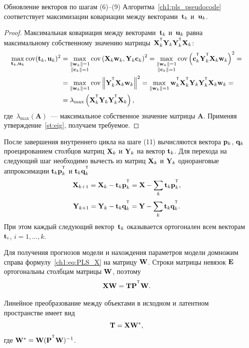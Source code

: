 \begin{statement}
	Обновление векторов по шагам (6)--(9) Алгоритма~\ref{ch1:pls_pseudocode} соответствует максимизации ковариации между векторами~$\mathbf{t}_k$ и~$\mathbf{u}_k$.
\end{statement}
\begin{proof}
	Максимальная ковариация между векторами~$\mathbf{t}_k$ и~$\mathbf{u}_k$ равна максимальному собственному значению матрицы~$\bX_k^{\T} \bY_k \bY_k^{\T} \bX_k$:
	\begin{align*}
		\max_{\bt_k, \bu_k}  \text{cov} (\bt_k, \bu_k)^2 &= \max_{\substack{\|\bw_k\|=1 \\ \|\bc_k\| = 1}} \text{cov} \left( \bX_k \bw_k, \bY_k \bc_k \right)^2 = \max_{\substack{\|\bw_k\|=1 \\ \|\bc_k\| = 1}} \text{cov} \left(\bc_k^{\T}  \bY_k^{\T} \bX_k \bw_k \right)^2 = \\
		&= \max_{\|\bw_k\| = 1} \text{cov} \left\|\bY_k^{\T} \bX_k \bw_k \right\|^2 = \max_{\|\bw_k\| = 1} \bw_k^{\T} \bX_k^{\T} \bY_k \bY_k^{\T} \bX_k \bw_k = \\
		& = \lambda_{\max} \left( \bX_k^{\T} \bY_k \bY_k^{\T} \bX_k \right),
	\end{align*}
	где~$\lambda_{\max} (\mathbf{A})$~--- максимальное собственное значение матрицы $\mathbf{A}$.
	Применяя утверждение~\ref{st:eig}, получаем требуемое.
\end{proof}

После завершения внутреннего цикла на шаге (11) вычисляются вектора $\mathbf{p}_k$, $\mathbf{q}_k$ проецированием столбцов матриц $\mathbf{X}_k$ и $\mathbf{Y}_k$ на вектор $\mathbf{t}_k$. 
Для перехода на следующий шаг необходимо вычесть из матриц $\mathbf{X}_k$ и $\mathbf{Y}_k$ одноранговые аппроксимации $\bt_k \bp_k^{\T}$ и $\bt_k \bq_k^{\T}$
\begin{equation*}
	\bX_{k + 1} = \bX_{k} - \bt_k \bp_k^{\T} = \bX - \sum_k \bt_k \bp_k^{\T},
\end{equation*}
\begin{equation*}
	\bY_{k + 1} = \bY_{k} - \bt_k \bq_k^{\T} = \bY - \sum_k \bt_k \bq_k^{\T}.
\end{equation*}
При этом каждый следующий вектор~$\mathbf{t}_k$ оказывается ортогонален всем векторам~$\mathbf{t}_i$, $i=1, \dots, k$.

Для получения прогнозов модели и нахождения параметров модели 
домножим справа формулу~\eqref{ch1:eq:PLS_X} на матрицу $\mathbf{W}$. Строки матрицы невязок $\mathbf{E}$ ортогональны столбцам матрицы $\mathbf{W}$, поэтому 
\[
\bX \bW = \bT \bP^{\T} \bW.
\] 

Линейное преобразование между объектами в исходном и латентном пространстве имеет вид
\begin{equation}
	\mathbf{T} = \mathbf{X} \mathbf{W}^*,
	\label{ch1:eq:W*}
\end{equation}
где $\bW^* = \bW (\bP^{\T} \bW)^{-1}$. 


